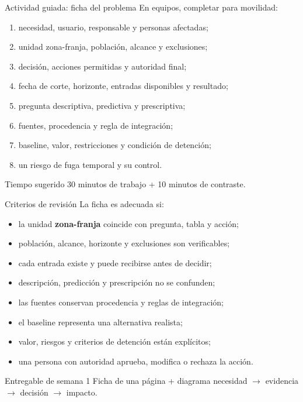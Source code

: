 \documentclass[aspectratio=169,11pt]{beamer}
\begin{document}
\begin{frame}{Actividad guiada: ficha del problema}
  \small
  En equipos, completar para movilidad:
  \begin{enumerate}
    \item necesidad, usuario, responsable y personas afectadas;
    \item unidad zona-franja, población, alcance y exclusiones;
    \item decisión, acciones permitidas y autoridad final;
    \item fecha de corte, horizonte, entradas disponibles y resultado;
    \item pregunta descriptiva, predictiva y prescriptiva;
    \item fuentes, procedencia y regla de integración;
    \item baseline, valor, restricciones y condición de detención;
    \item un riesgo de fuga temporal y su control.
  \end{enumerate}
  \begin{block}{Tiempo sugerido}
    30 minutos de trabajo + 10 minutos de contraste.
  \end{block}
\end{frame}

\begin{frame}{Criterios de revisión}
  La ficha es adecuada si:
  \begin{itemize}
    \item la unidad \textbf{zona-franja} coincide con pregunta, tabla y acción;
    \item población, alcance, horizonte y exclusiones son verificables;
    \item cada entrada existe y puede recibirse antes de decidir;
    \item descripción, predicción y prescripción no se confunden;
    \item las fuentes conservan procedencia y reglas de integración;
    \item el baseline representa una alternativa realista;
    \item valor, riesgos y criterios de detención están explícitos;
    \item una persona con autoridad aprueba, modifica o rechaza la acción.
  \end{itemize}
  \begin{block}{Entregable de semana 1}
    Ficha de una página + diagrama necesidad $\rightarrow$ evidencia $\rightarrow$ decisión $\rightarrow$ impacto.
  \end{block}
\end{frame}
\end{document}
